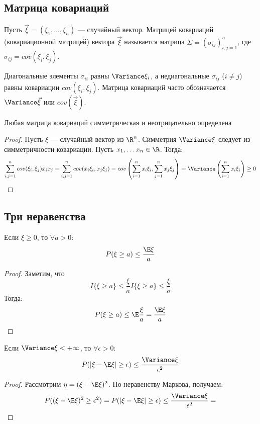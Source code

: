 
\subsection{Матрица ковариаций}

\begin{definition}
    Пусть $\vec{\xi} = (\xi_1,\dots,\xi_n)$ --- случайный вектор. Матрицей ковариаций (ковариационной матрицей) вектора $\vec{\xi}$ называется матрица $\Sigma = (\sigma_{ij})_{i,j=1}^n$, где $\sigma_{ij} = cov(\xi_i, \xi_j)$.
\end{definition}

\begin{note}
    Диагональные элементы $\sigma_{ii}$ равны $\Variance \xi_i$, а недиагональные $\sigma_{ij}$ ($i \neq j$) равны ковариации $cov(\xi_i,\xi_j)$. Матрица ковариаций часто обозначается $\Variance \vec{\xi}$ или $cov(\vec{\xi})$.
\end{note}

\begin{proposition}
    Любая матрица ковариаций симметрическая и неотрицательно определена
\end{proposition}
\begin{proof}
    Пусть \(\xi\) --- случайный вектор из \(\R^n\). Симметрия \(\Variance \xi\) следует из симметричности ковариации. Пусть \(x_1, \dots x_n \in \R\). Тогда:
    \[\sum_{i, j = 1}^n cov(\xi_i, \xi_j)x_ix_j = \sum_{i, j = 1}^n cov(x_i\xi_i, x_j\xi_j) = cov\left( \sum_{i = 1}^n x_i\xi_i, \sum_{j = 1}^n x_j\xi_j \right) = \Variance\left( \sum_{i = 1}^n x_i\xi_i \right) \ge 0\]
\end{proof}

\subsection{Три неравенства}

\begin{theorem}
    Если \(\xi \ge 0\), то \(\forall a > 0\):
    \[P(\xi \ge a) \le \frac{\E\xi}{a}\]
\end{theorem}
\begin{proof}
    Заметим, что
    \[I\{\xi \ge a\} \le \frac{\xi}{a}I\{\xi \ge a\} \le \frac{\xi}{a}\]
    Тогда:
    \[P(\xi \ge a) \le \E\frac{\xi}{a} = \frac{\E\xi}{a}\]
\end{proof}

\begin{theorem}
    Если \(\Variance \xi < +\infty\), то \(\forall \epsilon > 0\):
    \[P(|\xi - \E\xi| \ge \epsilon) \le \frac{\Variance \xi}{\epsilon^2}\]
\end{theorem}
\begin{proof}
    Рассмотрим \(\eta = (\xi - \E\xi)^2\). По неравенству Маркова, получаем:
    \[P((\xi - \E\xi)^2 \ge \epsilon^2) = P(|\xi - \E\xi| \ge \epsilon) \le \frac{\Variance \xi}{\epsilon^2} = \]
\end{proof}

